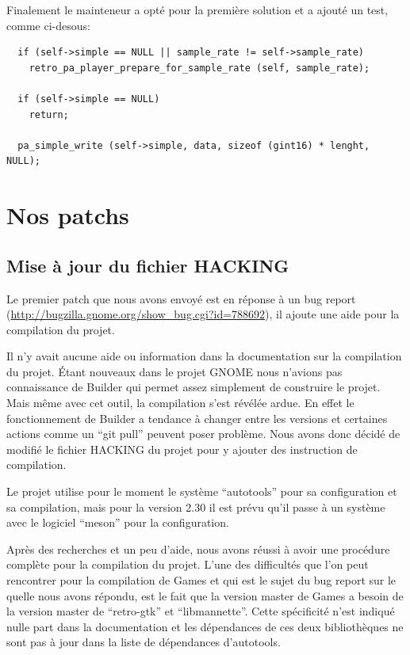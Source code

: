 \documentclass[12pt]{report}
\begin{document}
Finalement le mainteneur a opté pour la première solution et a ajouté un test, comme
ci-desous:
\begin{verbatim}
  if (self->simple == NULL || sample_rate != self->sample_rate)
    retro_pa_player_prepare_for_sample_rate (self, sample_rate);

  if (self->simple == NULL)
    return;

  pa_simple_write (self->simple, data, sizeof (gint16) * lenght, NULL);
\end{verbatim}

\section{Nos patchs}
\subsection{Mise à jour du fichier HACKING}
\label{HACKING}
Le premier patch que nous avons envoyé est en réponse à un bug report
(\url{http://bugzilla.gnome.org/show_bug.cgi?id=788692}), il ajoute une aide
pour la compilation du projet.

Il n'y avait aucune aide ou information dans la documentation sur la compilation
du projet. Étant nouveaux dans le projet GNOME nous n'avions pas connaissance de 
Builder qui permet assez simplement de construire le projet. Mais même avec cet
outil, la compilation s'est révélée ardue. En effet le fonctionnement de Builder a
tendance à changer entre les versions et certaines actions comme un ``git pull''
peuvent poser problème. Nous avons donc décidé de modifié le fichier HACKING du
projet pour y ajouter des instruction de compilation.

Le projet utilise pour le moment le système ``autotools'' pour sa configuration et 
sa compilation, mais pour la version 2.30 il est prévu qu'il passe à un système
avec le logiciel ``meson'' pour la configuration.

Après des recherches et un peu d'aide, nous avons réussi à avoir une procédure
complète pour la compilation du projet. L'une des difficultés que l'on peut
rencontrer pour la compilation de Games et qui est le sujet du bug report sur le
quelle nous avons répondu, est le fait que la version master de Games a besoin de
la version master de ``retro-gtk'' et ``libmannette''. Cette spécificité n'est
indiqué nulle part dans la documentation et les dépendances de ces deux
bibliothèques ne sont pas à jour dans la liste de dépendances d'autotools.
\end{document}
